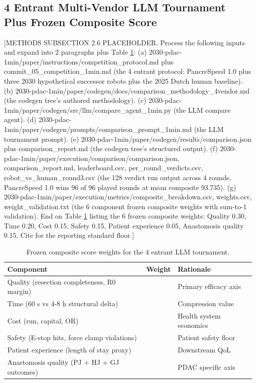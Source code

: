 \subsection{4 Entrant Multi-Vendor LLM Tournament Plus Frozen Composite Score}
\label{sec:methods-tournament}

[METHODS SUBSECTION 2.6 PLACEHOLDER. Process the following inputs and expand into 2 paragraphs plus Table \ref{tab:methods-weights}:
(a) 2030-pdac-1min/paper/instructions/competition_protocol.md plus commit_05_competition_1min.md (the 4 entrant protocol: PancreSpeed 1.0 plus three 2030 hypothetical successor robots plus the 2025 Dutch human baseline).
(b) 2030-pdac-1min/paper/codegen/docs/comparison_methodology_4vendor.md (the codegen tree's authored methodology).
(c) 2030-pdac-1min/paper/codegen/src/llm/compare_agent_1min.py (the LLM compare agent).
(d) 2030-pdac-1min/paper/codegen/prompts/comparison_prompt_1min.md (the LLM tournament prompt).
(e) 2030-pdac-1min/paper/codegen/results/comparison.json plus comparison_report.md (the codegen tree's structured output).
(f) 2030-pdac-1min/paper/execution/comparison/{comparison.json, comparison_report.md, leaderboard.csv, per_round_verdicts.csv, robot_vs_human_round3.csv} (the 128 verdict run output across 4 rounds, PancreSpeed 1.0 wins 96 of 96 played rounds at mean composite 93.735).
(g) 2030-pdac-1min/paper/execution/metrics/{composite_breakdown.csv, weights.csv, weight_validation.txt} (the 6 component frozen composite weights with sum-to-1 validation).
End on Table \ref{tab:methods-weights} listing the 6 frozen composite weights: Quality 0.30, Time 0.20, Cost 0.15, Safety 0.15, Patient experience 0.05, Anastomosis quality 0.15. Cite \cite{Collins2024TRIPODAI, ElEmam2024CREMLS} for the reporting standard floor.]

\begin{table}[H]
\caption{Frozen composite score weights for the 4 entrant LLM tournament.}
\label{tab:methods-weights}
\centering
\begin{tabular}{>{\raggedright\arraybackslash}p{4.0cm} >{\raggedright\arraybackslash}p{2.4cm} >{\raggedright\arraybackslash}p{6.4cm}}
\toprule
\textbf{Component} & \textbf{Weight} & \textbf{Rationale} \\
\midrule
  Quality (resection completeness, R0 margin) & 0.30 & Primary efficacy axis \\
  Time (60 s vs 4-8 h structural delta) & 0.20 & Compression value \\
  Cost (run, capital, OR) & 0.15 & Health system economics \\
  Safety (E-stop hits, force clamp violations) & 0.15 & Patient safety floor \\
  Patient experience (length of stay proxy) & 0.05 & Downstream QoL \\
  Anastomosis quality (PJ + HJ + GJ outcomes) & 0.15 & PDAC specific axis \\
\bottomrule
\end{tabular}
\end{table}

